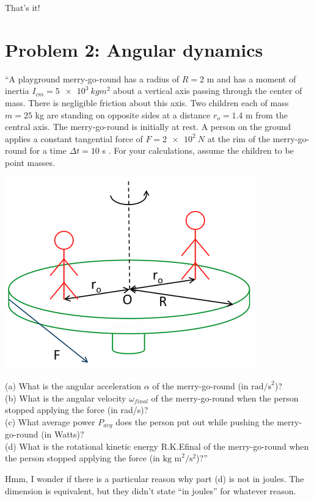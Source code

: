 \documentclass[12pt,a4paper]{report}
\begin{document}
That's it!

\section{Problem 2: Angular dynamics}

``A playground merry-go-round has a radius of $R = 2$  m and has a moment of inertia $I_{cm} = \SI{5e3}{kg m^2}$ about a vertical axis passing through the center of mass. There is negligible friction about this axis. Two children each of mass $m = 25$ kg are standing on opposite sides at a distance $r_o = 1.4$ m from the central axis. The merry-go-round is initially at rest. A person on the ground applies a constant tangential force of $F = \SI{2e2}{N}$ at the rim of the merry-go-round for a time $\Delta t = 10$ s . For your calculations, assume the children to be point masses.

\begin{center}
\includegraphics[scale=0.65]{Graphics/h7p2}
\end{center}

(a) What is the angular acceleration $\alpha$ of the merry-go-round (in $\text{rad/s}^2$)?\\
(b) What is the angular velocity $\omega_{final}$ of the merry-go-round when the person stopped applying the force (in rad/s)?\\
(c) What average power $P_{avg}$ does the person put out while pushing the merry-go-round (in Watts)?\\
(d) What is the rotational kinetic energy R.K.Efinal of the merry-go-round when the person stopped applying the force (in $\text{kg m}^2/\text{s}^2$)?''

Hmm, I wonder if there is a particular reason why part (d) is not in joules. The dimension is equivalent, but they didn't state ``in joules'' for whatever reason.
\end{document}
